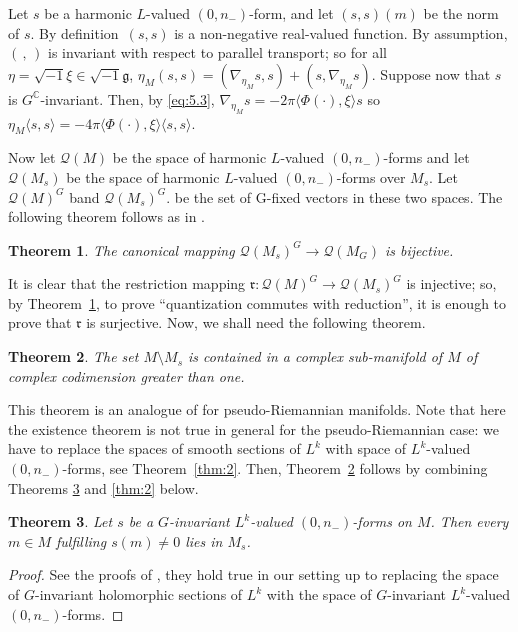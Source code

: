 \documentclass[10pt,a4paper]{amsart}
\numberwithin{equation}{section}
\newtheorem{Theorem}{Theorem}[section]
\begin{document}
 	Let $s$ be a harmonic $L$-valued $(0,n_-)$-form, and let $(s, s)(m)$ be the norm of $s$. By definition~$(s,s)$ is a non-negative real-valued function. By assumption, $( \,,\, )$ is invariant with respect to parallel transport; so for all $\eta=\sqrt{-1} \xi\in \sqrt{-1}\mathfrak{g}$,
$\eta_M (s,s)=(\nabla_{\eta_M}s, s)+(s, \nabla_{\eta_M}s)$.
 	Suppose now that $s$ is $G^{\mathbb{C}}$-invariant. Then, by \eqref{eq:5.3},
 	$\nabla_{\eta_M} s=-2\pi \langle\Phi(\cdot), {\xi}\rangle s$
 	so
 	$\eta_M\langle s, s \rangle=-4\pi \langle\Phi(\cdot), {\xi}\rangle \langle s, s\rangle $.
 	
 	Now let $\mathcal{Q}(M)$ be the space of harmonic $L$-valued $(0,n_-)$-forms and let $\mathcal{Q}(M_s)$ be the space of harmonic $L$-valued $(0,n_-)$-forms over $M_s$. Let $\mathcal{Q}(M)^G$ band $\mathcal{Q}(M_s)^G$. be the set of G-fixed vectors in these two spaces. The following theorem follows as in \cite[Theorem 5.2]{gs}.
 	
 	\begin{Theorem} \label{thm:5.2}
 		The canonical mapping $\mathcal{Q}(M_s)^G \rightarrow \mathcal{Q}(M_G)$ is bijective.
 	\end{Theorem}
 	
 	It is clear that the restriction mapping $\mathfrak{r} \colon \mathcal{Q}(M)^G \rightarrow \mathcal{Q}(M_s)^G$ is injective; so, by Theorem~\ref{thm:5.2}, to prove ``quantization commutes with reduction'', it is enough to prove that $\mathfrak{r}$ is surjective. Now, we shall need the following theorem.
 	
 	\begin{Theorem} \label{thm:openanddense}
 		The set $M\setminus M_s$ is contained in a complex sub-manifold of $M$ of complex codimension greater than one.
 	\end{Theorem}

 	This theorem is an analogue of \cite[Theorem 5.7]{gs} for pseudo-Riemannian manifolds. Note that here the existence theorem \cite[Theorem 5.6]{gs} is not true in general for the pseudo-Riemannian case: we have to replace the spaces of smooth sections of $L^k$ with space of $L^k$-valued $(0, n_-)$-forms, see Theorem~\ref{thm:2}. Then, Theorem~\ref{thm:openanddense} follows by combining Theorems \ref{thm:1} and \ref{thm:2} below.
 	
 	\begin{Theorem} \label{thm:1}
 		Let $s$ be a $G$-invariant $L^k$-valued $(0, n_-)$-forms on $M$. Then every $m\in M$ fulfilling $s(m)\neq 0$ lies in $M_s$.
 	\end{Theorem}
 	\begin{proof}
 		See the proofs of \cite[Theorems 5.3 and 5.4]{gs}, they hold true in our setting up to replacing the space of $G$-invariant holomorphic sections of $L^k$ with the space of $G$-invariant $L^k$-valued $(0, n_-)$-forms.
 	\end{proof}
\end{document}
